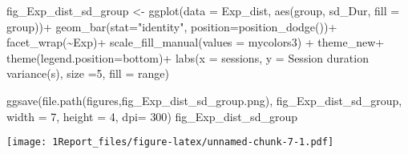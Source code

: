 \documentclass[
]{article}
\newenvironment{Shaded}{\begin{snugshade}}{\end{snugshade}}
\newcommand{\AttributeTok}[1]{\textcolor[rgb]{0.77,0.63,0.00}{#1}}
\newcommand{\DecValTok}[1]{\textcolor[rgb]{0.00,0.00,0.81}{#1}}
\newcommand{\FunctionTok}[1]{\textcolor[rgb]{0.00,0.00,0.00}{#1}}
\newcommand{\NormalTok}[1]{#1}
\newcommand{\OtherTok}[1]{\textcolor[rgb]{0.56,0.35,0.01}{#1}}
\newcommand{\SpecialCharTok}[1]{\textcolor[rgb]{0.00,0.00,0.00}{#1}}
\newcommand{\StringTok}[1]{\textcolor[rgb]{0.31,0.60,0.02}{#1}}
\begin{document}
\begin{Shaded}
\begin{Highlighting}[]
\NormalTok{fig\_Exp\_dist\_sd\_group }\OtherTok{\textless{}{-}} \FunctionTok{ggplot}\NormalTok{(}\AttributeTok{data =}\NormalTok{ Exp\_dist, }\FunctionTok{aes}\NormalTok{(group, sd\_Dur, }\AttributeTok{fill =}\NormalTok{ group))}\SpecialCharTok{+}
  \FunctionTok{geom\_bar}\NormalTok{(}\AttributeTok{stat=}\StringTok{"identity"}\NormalTok{, }\AttributeTok{position=}\FunctionTok{position\_dodge}\NormalTok{())}\SpecialCharTok{+}
  \FunctionTok{facet\_wrap}\NormalTok{(}\SpecialCharTok{\textasciitilde{}}\NormalTok{Exp)}\SpecialCharTok{+}
  \FunctionTok{scale\_fill\_manual}\NormalTok{(}\AttributeTok{values =}\NormalTok{ mycolors3) }\SpecialCharTok{+}
\NormalTok{  theme\_new}\SpecialCharTok{+} \FunctionTok{theme}\NormalTok{(}\AttributeTok{legend.position=}\StringTok{\textquotesingle{}bottom\textquotesingle{}}\NormalTok{)}\SpecialCharTok{+}
  \FunctionTok{labs}\NormalTok{(}\AttributeTok{x =} \StringTok{\textquotesingle{}sessions\textquotesingle{}}\NormalTok{, }\AttributeTok{y =} \StringTok{\textquotesingle{}Session duration variance(s)\textquotesingle{}}\NormalTok{, }\AttributeTok{size =}\DecValTok{5}\NormalTok{,  }\AttributeTok{fill =} \StringTok{\textquotesingle{}range\textquotesingle{}}\NormalTok{)}

\FunctionTok{ggsave}\NormalTok{(}\FunctionTok{file.path}\NormalTok{(}\StringTok{\textquotesingle{}figures\textquotesingle{}}\NormalTok{,}\StringTok{\textquotesingle{}fig\_Exp\_dist\_sd\_group.png\textquotesingle{}}\NormalTok{), fig\_Exp\_dist\_sd\_group, }\AttributeTok{width =} \DecValTok{7}\NormalTok{, }\AttributeTok{height =} \DecValTok{4}\NormalTok{, }\AttributeTok{dpi=} \DecValTok{300}\NormalTok{)}
\NormalTok{fig\_Exp\_dist\_sd\_group}
\end{Highlighting}
\end{Shaded}

\texttt{[image: 1Report\_files/figure-latex/unnamed-chunk-7-1.pdf]}
\end{document}

